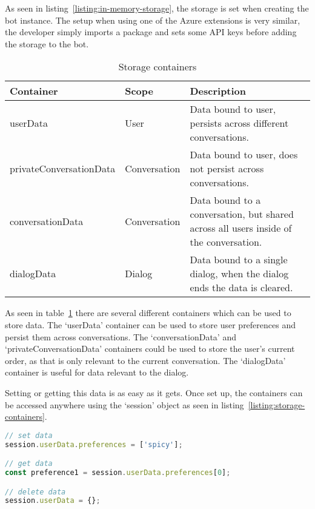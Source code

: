 As seen in listing~\ref{listing:in-memory-storage}, the storage is set when creating the bot instance. The setup when using one of the Azure extensions is very similar, the developer simply imports a package and sets some API keys before adding the storage to the bot.

\begin{table}[h]
	\centering
	\begin{tabular}{p{} | p{} | p{}}
		Container               & Scope        & Description                                                                           \\
		\hline
		userData                & User         & Data bound to user, persists across different conversations.                          \\
		privateConversationData & Conversation & Data bound to user, does not persist across conversations.                            \\
		conversationData        & Conversation & Data bound to a conversation, but shared across all users inside of the conversation. \\
		dialogData              & Dialog       & Data bound to a single dialog, when the dialog ends the data is cleared.
	\end{tabular}
	\caption{Storage containers}
	\label{tab:storage-containers}
\end{table}

As seen in table~\ref{tab:storage-containers} there are several different containers which can be used to store data. The `userData' container can be used to store user preferences and persist them across conversations. The `conversationData' and `privateConversationData' containers could be used to store the user's current order, as that is only relevant to the current conversation. The `dialogData' container is useful for data relevant to the dialog.

Setting or getting this data is as easy as it gets. Once set up, the containers can be accessed anywhere using the `session' object as seen in listing~\ref{listing:storage-containers}.

\newpage

\begin{lstlisting}[language=JavaScript,caption={Example on how to use the storage containers},label={listing:storage-containers}]
// set data
session.userData.preferences = ['spicy']; 

// get data
const preference1 = session.userData.preferences[0];

// delete data
session.userData = {};
\end{lstlisting}
